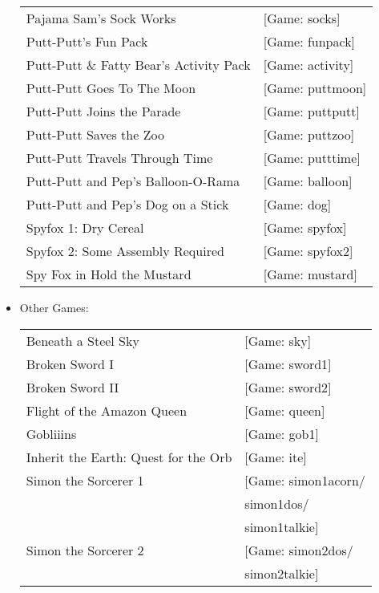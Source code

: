 \begin{itemize}
\begin{tabular}[h]{ll}
    Pajama Sam's Sock Works&                                       [Game: socks]\\
    Putt-Putt's Fun Pack&                                          [Game: funpack]\\
    Putt-Putt \& Fatty Bear's Activity Pack&                       [Game: activity]\\
    Putt-Putt Goes To The Moon&                                    [Game: puttmoon]\\
    Putt-Putt Joins the Parade&                                    [Game: puttputt]\\
    Putt-Putt Saves the Zoo&                                       [Game: puttzoo]\\
    Putt-Putt Travels Through Time&                                [Game: putttime]\\
    Putt-Putt and Pep's Balloon-O-Rama&                            [Game: balloon]\\
    Putt-Putt and Pep's Dog on a Stick&                            [Game: dog]\\
    Spyfox 1: Dry Cereal&                                          [Game: spyfox]\\
    Spyfox 2: Some Assembly Required&                              [Game: spyfox2]\\
    Spy Fox in Hold the Mustard&                                   [Game: mustard]\\
  \end{tabular}
\item Other Games:\\ 
  \begin{tabular}[h]{ll}
    Beneath a Steel Sky&                           [Game: sky]\\
    Broken Sword I&                                [Game: sword1]\\
    Broken Sword II&                               [Game: sword2]\\
    Flight of the Amazon Queen&                    [Game: queen]\\
    Gobliiins&                                     [Game: gob1]\\
    Inherit the Earth: Quest for the Orb&          [Game: ite]\\
     Simon the Sorcerer 1&                         [Game: simon1acorn/\\
     &                                                    simon1dos/\\
     &                                                    simon1talkie]\\
     Simon the Sorcerer 2&                         [Game: simon2dos/\\
     &                                                    simon2talkie]\\
  \end{tabular}


\end{itemize}
